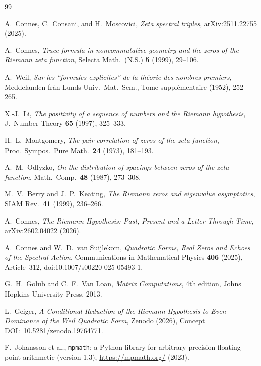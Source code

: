 \documentclass[12pt,a4paper]{article}
\theoremstyle{definition}
\theoremstyle{remark}
\begin{document}

\begin{thebibliography}{99}

A.~Connes, C.~Consani, and H.~Moscovici,
\emph{Zeta spectral triples},
arXiv:2511.22755 (2025).

A.~Connes,
\emph{Trace formula in noncommutative geometry and the zeros of the
Riemann zeta function},
Selecta Math.~(N.S.) \textbf{5} (1999), 29--106.

A.~Weil,
\emph{Sur les ``formules explicites'' de la th{\'e}orie des nombres
premiers},
Meddelanden fr{\aa}n Lunds Univ.\ Mat.\ Sem., Tome suppl{\'e}mentaire
(1952), 252--265.

X.-J.~Li,
\emph{The positivity of a sequence of numbers and the Riemann hypothesis},
J.~Number Theory \textbf{65} (1997), 325--333.

H.~L.~Montgomery,
\emph{The pair correlation of zeros of the zeta function},
Proc.\ Sympos.\ Pure Math.\ \textbf{24} (1973), 181--193.

A.~M.~Odlyzko,
\emph{On the distribution of spacings between zeros of the zeta function},
Math.\ Comp.\ \textbf{48} (1987), 273--308.

M.~V.~Berry and J.~P.~Keating,
\emph{The Riemann zeros and eigenvalue asymptotics},
SIAM Rev.\ \textbf{41} (1999), 236--266.

A.~Connes,
\emph{The Riemann Hypothesis: Past, Present and a Letter Through Time},
arXiv:2602.04022 (2026).

A.~Connes and W.~D.~van Suijlekom,
\emph{Quadratic Forms, Real Zeros and Echoes of the Spectral Action},
Communications in Mathematical Physics \textbf{406} (2025), Article~312,
doi:10.1007/s00220-025-05493-1.

G.~H.~Golub and C.~F.~Van Loan,
\emph{Matrix Computations},
4th edition, Johns Hopkins University Press, 2013.

L.~Geiger,
\emph{A Conditional Reduction of the Riemann Hypothesis to Even Dominance of the
Weil Quadratic Form},
Zenodo (2026), Concept DOI:~10.5281/zenodo.19764771.

F.~Johansson et al.,
\texttt{mpmath}: a Python library for arbitrary-precision floating-point
arithmetic (version 1.3),
\url{https://mpmath.org/} (2023).


\end{thebibliography}
\end{document}
